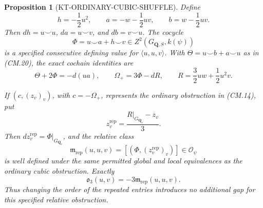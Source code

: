 \documentclass[11pt,a4paper]{article}
\newtheorem{proposition}[theorem]{Proposition}
\theoremstyle{definition}
\begin{document}
\begin{proposition}[KT-ORDINARY-CUBIC-SHUFFLE]
Define
\[
 h=-\frac12u^2,\qquad a=-w-\frac12uv,\qquad
 b=w-\frac12uv .                                      \tag{CS.1}
\]
Then \(dh=u\smile u\), \(da=u\smile v\), and
\(db=v\smile u\).  The cocycle
\[
 \Phi=u\smile a+h\smile v\in Z^2(G_{\mathbf Q,S},k(\psi))
                                                               \tag{CS.2}
\]
is a specified consecutive defining value for
\(\langle u,u,v\rangle\).  With
\(\Theta=u\smile b+a\smile u\) as in (CM.20), the exact
cochain identities are
\[
 \Theta+2\Phi=-d(ua),\qquad
 \Omega_+=3\Phi-dR,\qquad
 R=\frac32uw+\frac12u^2v.                              \tag{CS.3}
\]

If \((c,(z_v)_v)\), with \(c=-\Omega_+\), represents
the ordinary obstruction in (CM.14), put
\[
 z^{\mathrm{rep}}_v=\frac{R|_{G_{\mathbf Q_v}}-z_v}{3}.
                                                               \tag{CS.4}
\]
Then \(d z^{\mathrm{rep}}_v=\Phi|_{G_{\mathbf Q_v}}\),
and the relative class
\[
 \mathfrak m_{\mathrm{rep}}(u,u,v)
       =[(\Phi,(z^{\mathrm{rep}}_v)_v)]\in\mathcal O_\psi
                                                               \tag{CS.5}
\]
is well defined under the same permitted global and local
equivalences as the ordinary cubic obstruction.  Exactly
\[
             \mathfrak o_3(u,v)=-3\mathfrak m_{\mathrm{rep}}(u,u,v).
                                                               \tag{CS.6}
\]
Thus changing the order of the repeated entries introduces
no additional gap for this specified relative obstruction.
\end{proposition}
\end{document}
